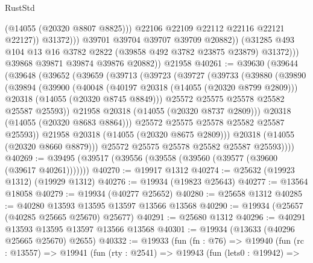 \begin{lexlean}{RustStd}
\begin{coremodule}
                            (@14055 (@20320 @8807 @8825)))
                          @22106
                          @22109
                          @22112
                          @22116
                          @22121
                          @22127))
                      @31372)))
                @39701
                @39704
                @39707
                @39709
                @20882))
            (@31285 @493 @104 @13 @16 @3782 @2822 (@39858 @492 @3782 @23875 @23879) @31372)))
        @39868
        @39871
        @39874
        @39876
        @20882))
    @21958
@40261 := @39630
    (@39644
      (@39648
        (@39652
          (@39659
            (@39713
              (@39723
                (@39727
                  (@39733
                    (@39880
                      (@39890
                        (@39894
                          (@39900
                            (@40048
                              (@40197 @20318 (@14055 (@20320 @8799 @2809)))
                              @20318
                              (@14055 (@20320 @8745 @8849)))
                            @25572
                            @25575
                            @25578
                            @25582
                            @25587
                            @25593))
                        @21958
                        @20318
                        (@14055 (@20320 @8737 @2809)))
                      @20318
                      (@14055 (@20320 @8683 @8864)))
                    @25572
                    @25575
                    @25578
                    @25582
                    @25587
                    @25593))
                @21958
                @20318
                (@14055 (@20320 @8675 @2809)))
              @20318
              (@14055 (@20320 @8660 @8879)))
            @25572
            @25575
            @25578
            @25582
            @25587
            @25593))))
@40269 := @39495 (@39517 (@39556 (@39558 (@39560 (@39577 (@39600 (@39617 @40261)))))))
@40270 := @19917 @1312
@40274 := @25632 (@19923 @1312) (@19929 @1312)
@40276 := @19934 (@19823 @25643)
@40277 := @13564 @18058
@40279 := @19934 (@40277 @25652)
@40280 := @25658 @1312
@40285 := @40280 @13593 @13595 @13597 @13566 @13568
@40290 := @19934 (@25657 (@40285 @25665 @25670) @25677)
@40291 := @25680 @1312
@40296 := @40291 @13593 @13595 @13597 @13566 @13568
@40301 := @19934 (@13633 (@40296 @25665 @25670) @2655)
@40332 := @19933
    (fun (fn : @76) =>
    @19940
      (fun (rc : @13557) =>
      @19941
        (fun (rty : @2541) =>
        @19943
          (fun (lets0 : @19942) =>

\end{coremodule}
\end{lexlean}
